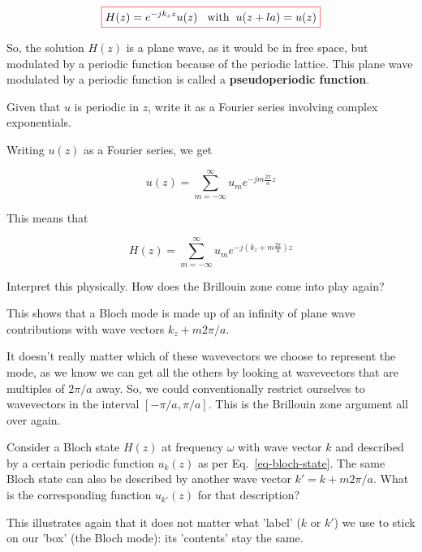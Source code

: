 \begin{equation}
\fbox{$\displaystyle  
    H(z) = e^{-j k_z z} u(z) \hspace{.3 cm} \textrm{with} \hspace{.2 cm} u(z+la) = u(z) \label{eq-bloch-state}
$}
\end{equation} 

So, the solution $H(z)$ is a plane wave, as it would be in free space, but modulated by a periodic function because of the periodic lattice. This plane wave modulated by a periodic function is called a \textbf{pseudoperiodic function}.

\begin{cue}
  Given that $u$ is periodic in $z$, write it as a Fourier series involving complex exponentials.
\end{cue} 

Writing $u(z)$ as a Fourier series, we get

\begin{equation}
u(z) =  \sum_{m=-\infty}^{\infty} u_m {e^{-j m \frac{2 \pi}{a} z}}
\end{equation} 

This means that

\begin{equation}
H(z)=  \sum_{m=-\infty}^{\infty} u_m {e^{-j \left( k_z + m \frac{2 \pi}{a} \right) z}}
\end{equation} 

\begin{cue}
Interpret this physically. How does the Brillouin zone come into play again?
\end{cue}

This shows that a Bloch mode is made up of an infinity of plane wave contributions with wave vectors $k_z + m 2 \pi / a$.

It doesn't really matter which of these wavevectors we choose to represent the mode, as we know we can get all the others by looking at wavevectors that are multiples of $2 \pi / a$ away. So, we could conventionally restrict ourselves to wavevectors in the interval $[-\pi/a,\pi/a]$. This is the Brillouin zone argument all over again.


\begin{exer}
Consider a Bloch state $H(z)$ at frequency $\omega$ with wave vector $k$ and described by a certain periodic function $u_k(z)$ as per Eq.~\ref{eq-bloch-state}. The same Bloch state can also be described by another wave vector $k' = k+m 2 \pi / a$. What is the corresponding function $u_{k'}(z)$ for that description?

This illustrates again that it does not matter what 'label' ($k$ or $k'$) we use to stick on our 'box' (the Bloch mode): its 'contents' stay the same.
\end{exer}


